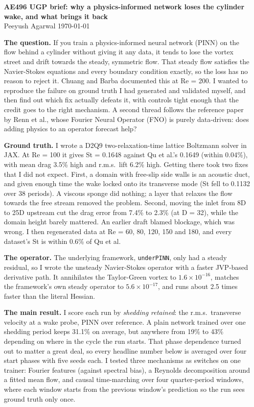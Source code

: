 \documentclass[11pt,a4paper]{article}
\begin{document}
{\large\textbf{AE496 UGP brief: why a physics-informed network loses the cylinder wake, and what brings it back}}\\[2pt]
Peeyush Agarwal \hfill \today

\textbf{The question.} If you train a physics-informed neural network (PINN) on
the flow behind a cylinder without giving it any data, it tends to lose the
vortex street and drift towards the steady, symmetric flow. That steady flow
satisfies the Navier-Stokes equations and every boundary condition exactly, so
the loss has no reason to reject it. Chuang and Barba documented this at
Re = 200. I wanted to reproduce the failure on ground truth I had generated and
validated myself, and then find out which fix actually defeats it, with
controls tight enough that the credit goes to the right mechanism. A second
thread follows the reference paper by Renn et al., whose Fourier Neural
Operator (FNO) is purely data-driven: does adding physics to an operator
forecast help?

\textbf{Ground truth.} I wrote a D2Q9 two-relaxation-time lattice Boltzmann
solver in JAX. At Re = 100 it gives St = 0.1648 against Qu et al.'s 0.1649
(within 0.04\%), with mean drag 3.5\% high and r.m.s.\ lift 6.2\% high. Getting
there took two fixes that I did not expect. First, a domain with free-slip side
walls is an acoustic duct, and given enough time the wake locked onto its
transverse mode (St fell to 0.1132 over 38 periods). A viscous sponge did
nothing; a layer that relaxes the flow towards the free stream removed the
problem. Second, moving the inlet from 8D to 25D upstream cut the drag error
from 7.4\% to 2.3\% (at D = 32), while the domain height barely mattered. An
earlier draft blamed blockage, which was wrong. I then regenerated data at
Re = 60, 80, 120, 150 and 180, and every dataset's St is within 0.6\% of Qu et al.

\textbf{The operator.} The underlying framework, \texttt{underPINN}, only had a
steady residual, so I wrote the unsteady Navier-Stokes operator with a faster
JVP-based derivative path. It annihilates the Taylor-Green vortex to
$1.6\times10^{-16}$, matches the framework's own steady operator to
$5.6\times10^{-17}$, and runs about 2.5 times faster than the literal Hessian.

\textbf{The main result.} I score each run by \emph{shedding retained}: the
r.m.s.\ transverse velocity at a wake probe, PINN over reference. A plain
network trained over one shedding period keeps 31.1\% on average, but anywhere
from 19\% to 43\% depending on where in the cycle the run starts. That phase
dependence turned out to matter a great deal, so every headline number below is
averaged over four start phases with five seeds each. I tested three mechanisms
as switches on one trainer: Fourier features (against spectral bias), a
Reynolds decomposition around a fitted mean flow, and causal time-marching
over four quarter-period windows, where each window starts from the previous
window's prediction so the run sees ground truth only once.
\end{document}
